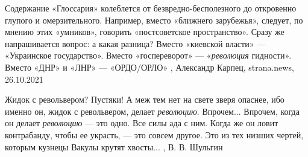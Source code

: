Содержание «Глоссария» колеблется от безвредно-бесполезного до откровенно
глупого и омерзительного.  Например, вместо «ближнего зарубежья», следует, по
мнению этих «умников», говорить «постсоветское пространство». Сразу же
напрашивается вопрос: а какая разница?  Вместо «киевской власти» — «Украинское
государство».  Вместо «госпереворот» — «\emph{революция} гидности».  Вместо
«ДНР» и «ЛНР» — «ОРДО/ОРЛО»
, 
Александр Карпец, strana.news, 26.10.2021

Жидок с револьвером? Пустяки!  А меж тем нет на свете зверя опаснее, ибо именно
он, жидок с револьвером, делает \emph{революцию}.  Впрочем...  Впрочем, когда он
делает \emph{революцию} — это одно. Все силы ада с ним.  Когда же он ловит
контрабанду, чтобы ее украсть, —   это совсем другое.  Это из тех низших
чертей, которым кузнецы Вакулы крутят хвосты...
, В. В. Шульгин
